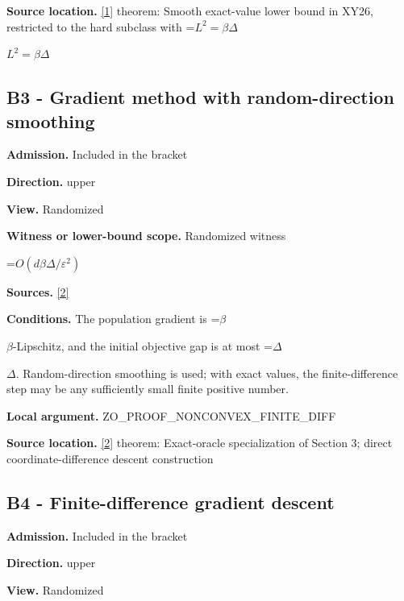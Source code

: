 \documentclass[10pt,a4paper]{article}
\newcommand{\AtlasMath}[1]{\par\begingroup\centering\setbox0=\hbox{$\displaystyle #1$}\ifdim\wd0>1.4\linewidth\typeout{ATLAS WIDE FORMULA: \the\wd0}\fi\ifdim\wd0>\linewidth\resizebox{\linewidth}{!}{\box0}\else\box0\fi\par\endgroup}
\newcommand{\AtlasInlineMath}[1]{\begingroup\setbox0=\hbox{$#1$}\ifdim\wd0>.4\linewidth\endgroup\AtlasMath{#1}\else\endgroup$#1$\fi}
\begin{document}
\textbf{Source location.} \href{https://arxiv.org/html/2610.19652v1}{[1]} theorem: Smooth exact-value lower bound in XY26, restricted to the hard subclass with \AtlasInlineMath{L^2=\beta\Delta}



\subsection{B3 - Gradient method with random-direction smoothing}


\textbf{Admission.} Included in the bracket



\textbf{Direction.} upper



\textbf{View.} Randomized



\textbf{Witness or lower-bound scope.} Randomized witness



\AtlasMath{O(d\beta \Delta/\varepsilon^2)}


\textbf{Sources.} \href{https://arxiv.org/pdf/1309.5549}{[2]}



\textbf{Conditions.} The population gradient is \AtlasInlineMath{\beta}-Lipschitz, and the initial objective gap is at most \AtlasInlineMath{\Delta}. Random-direction smoothing is used; with exact values, the finite-difference step may be any sufficiently small finite positive number.



\textbf{Local argument.} ZO\_PROOF\_NONCONVEX\_FINITE\_DIFF



\textbf{Source location.} \href{https://arxiv.org/pdf/1309.5549}{[2]} theorem: Exact-oracle specialization of Section 3; direct coordinate-difference descent construction



\subsection{B4 - Finite-difference gradient descent}


\textbf{Admission.} Included in the bracket



\textbf{Direction.} upper



\textbf{View.} Randomized
\end{document}
